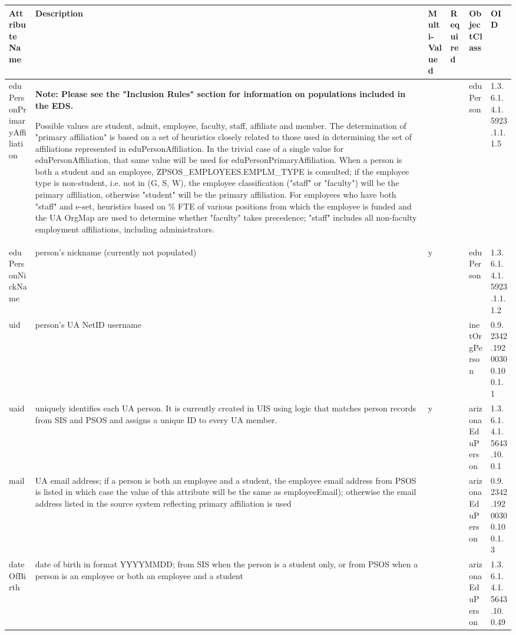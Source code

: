 \documentclass[12pt,notitlepage]{article}
\begin{document}
{\begin{tabular}{|p{3cm}|p{4cm}|p{0.7cm}|p{1cm}|l|l|}
\hline
\textbf{Attribute Name}& \textbf{Description} & \textbf{Multi-Valued} 
& \textbf{Required} & \textbf{ObjectClass} & \textbf{OID} \\
\hline
eduPersonPrimaryAffiliation & \textbf{Note: Please see the "Inclusion Rules" section for information on populations included in the EDS.}

Possible values are student, admit, employee, faculty, staff, affiliate and member. The 
determination of "primary affiliation" is based on a set of heuristics closely related to 
those used in determining the set of affiliations represented in eduPersonAffiliation. In 
the trivial case of a single value for eduPersonAffiliation, that same value will be used 
for eduPersonPrimaryAffiliation. When a person is both a student and an employee, 
ZPSOS\_EMPLOYEES.EMPLM\_TYPE is consulted; if the employee type is non-student, i.e. not in 
(G, S, W), the employee classification ("staff" or "faculty") will be the primary affiliation, 
otherwise "student" will be the primary affiliation. For employees who have both "staff" 
and e-set, heuristics based on \% FTE of various positions from which the employee is funded 
and the UA OrgMap are used to determine whether "faculty" takes precedence; "staff" includes 
all non-faculty employment affiliations, including administrators. & & & eduPerson & 1.3.6.1.4.1.5923.1.1.1.5 \\
\hline
eduPersonNickName & person's nickname (currently not populated) & y & & eduPerson & 1.3.6.1.4.1.5923.1.1.1.2\\
\hline
uid & person's UA NetID username & & & inetOrgPerson & 0.9.2342.19200300.100.1.1 \\
\hline
uaid & uniquely identifies each UA person. It is currently created in UIS using logic that
 matches person records from SIS and PSOS and assigns a unique ID to every UA member. &	y & & arizonaEduPerson 	& 1.3.6.1.4.1.5643.10.0.1\\
\hline
mail & UA email address; if a person is both an employee and a student, the employee
 email address from PSOS is listed in which case the value of this attribute will be the 
same as employeeEmail); otherwise the email address listed in the source system reflecting 
primary affiliation is used & & & arizonaEduPerson & 	0.9.2342.19200300.100.1.3 \\
\hline
dateOfBirth & date of birth in format YYYYMMDD; from SIS when the person is a student 
only, or from PSOS when a person is an employee or both an employee and a student & & & arizonaEduPerson & 1.3.6.1.4.1.5643.10.0.49 \\

\end{tabular}}
\end{document}
